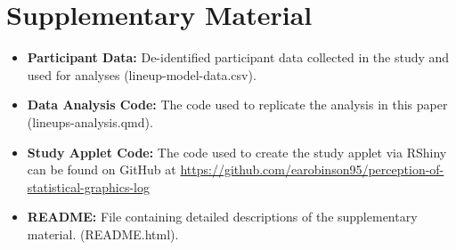 \documentclass[12pt]{article}
\providecommand{\tightlist}{%
  \setlength{\itemsep}{0pt}\setlength{\parskip}{0pt}}
\begin{document}
\hypertarget{supplementary-material}{%
\section*{Supplementary Material}\label{supplementary-material}}

\begin{itemize}
\tightlist
\item
  \textbf{Participant Data:} De-identified participant data collected in
  the study and used for analyses (lineup-model-data.csv).
\item
  \textbf{Data Analysis Code:} The code used to replicate the analysis
  in this paper (lineups-analysis.qmd).
\item
  \textbf{Study Applet Code:} The code used to create the study applet
  via RShiny can be found on GitHub at
  \url{https://github.com/earobinson95/perception-of-statistical-graphics-log}
\item
  \textbf{README:} File containing detailed descriptions of the
  supplementary material. (README.html).
\end{itemize}
\end{document}

